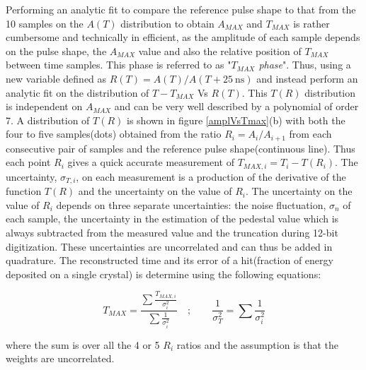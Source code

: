 Performing an analytic fit to compare the reference pulse shape to that from the 10 samples on the $A(T)$ distribution to obtain $A_{MAX}$ and $T_{MAX}$ is rather cumbersome and technically in efficient, as the amplitude of each sample depends on the pulse shape, the $A_{MAX}$ value and also the relative position of $T_{MAX}$ between time samples. This phase is referred to as "\textit{$T_{MAX}$ phase}".
Thus, using a new variable defined as $R(T) = A(T)/ A(T + 25~\mbox{ns})$ and instead perform an analytic fit on the distribution of $T - T_{MAX}$ Vs $ R(T)$. This  $T(R)$ distribution is independent on $A_{MAX}$ and can be very well described by a polynomial of order 7. A distribution of $T(R)$ is shown in figure \eqref{amplVsTmax}(b) with both the four to five samples(dots) obtained from the ratio $R_{i} = A_{i}/A_{i+1}$ from each consecutive pair of samples and the reference pulse shape(continuous line). Thus each point $R_{i}$ gives a quick accurate measurement of $T_{MAX,i} = T_{i} - T(R_{i})$. The uncertainty, $\sigma_{T,i}$, on each measurement is a production of the derivative of the function $T(R)$ and the uncertainty on the value of $R_{i}$. The uncertainty on the value of $R_{i}$ depends on three separate uncertainties: the noise fluctuation, $\sigma_{n}$ of each sample, the uncertainty in the estimation of the pedestal value which is always subtracted from the measured value and the truncation during 12-bit digitization. These uncertainties are uncorrelated and can thus be added in quadrature.
The reconstructed time and its error of a hit(fraction of energy deposited on a single crystal) is determine using the following equations:


\begin{equation}
\displaystyle{T_{MAX} = \frac{\sum \frac{T_{MAX,i}}{\sigma^{2}_{i}}}{\sum \frac{1}{\sigma^{2}_{i}}}} \quad ; \quad\quad
\displaystyle{\frac{1}{\sigma^{2}_{T}} =  \sum \frac{1}{\sigma^{2}_{i}} }
\end{equation}

where the sum is over all the 4 or 5 $R_{i}$ ratios and the assumption is that the weights are uncorrelated. 

